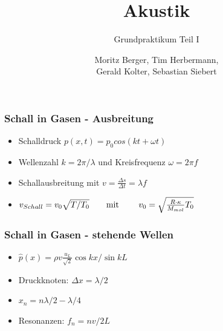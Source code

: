 \documentclass[12pt]{beamer}
\begin{document}
	\author{Moritz Berger, Tim Herbermann,\\ Gerald Kolter, Sebastian Siebert}
	\title{Akustik}
	\subtitle{Grundpraktikum Teil I}
	\frame[plain]{\maketitle}
	

	\begin{frame}
		\frametitle{Schall in Gasen - Ausbreitung}
		\begin{itemize}
		\item Schalldruck  $p(x, t) = p_0 cos(kt + \omega t)$
		\item Wellenzahl $k = 2\pi / \lambda$ und Kreisfrequenz $\omega = 2\pi f$
		\item Schallausbreitung mit $v = \frac{\Delta s}{\Delta t} = \lambda f$
		\end{itemize}
		\begin{itemize}
		\item $v_{Schall} = v_0 \sqrt{T/T_0} \text{\qquad mit \qquad} v_0 = \sqrt{\frac{R\cdot\kappa}{M_{mol}}T_0}$
		\end{itemize}
		
	\end{frame}
	
	\begin{frame}
		\frametitle{Schall in Gasen - stehende Wellen}
		\begin{itemize}
		\item $\hat{p}(x) = \rho v \frac{u_L}{\sqrt{2}} \cos kx/\sin kL$\\ [0.6cm]
		\item Druckknoten: $\Delta x = \lambda / 2$\\ [0.2cm]
		\item $x_n = n \lambda/2 - \lambda/4$\\ [0.45cm]
		\item Resonanzen: $f_n = n v/2L$
		\end{itemize}
		
	\end{frame}
\end{document}
